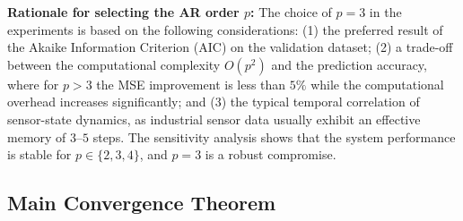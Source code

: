 \documentclass[10pt]{article}
\begin{document}
\textbf{Rationale for selecting the AR order $p$:} The choice of $p=3$ in the experiments is based on the following considerations: (1) the preferred result of the Akaike Information Criterion (AIC) on the validation dataset; (2) a trade-off between the computational complexity $O(p^2)$ and the prediction accuracy, where for $p>3$ the MSE improvement is less than $5\%$ while the computational overhead increases significantly; and (3) the typical temporal correlation of sensor-state dynamics, as industrial sensor data usually exhibit an effective memory of $3$--$5$ steps. The sensitivity analysis shows that the system performance is stable for $p\in\{2,3,4\}$, and $p=3$ is a robust compromise.

\subsection{Main Convergence Theorem}
\end{document}
